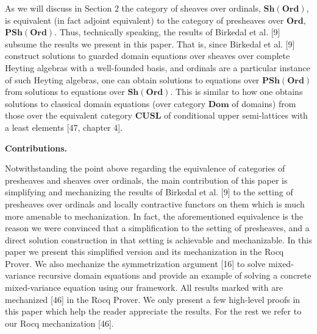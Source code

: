  
As we will discuss in Section 2 the category of sheaves over ordinals, $\mathbf{Sh}(\mathbf{Ord})$, is equivalent (in fact adjoint equivalent) to the category of presheaves over $\mathbf{Ord}$, $\mathbf{PSh}(\mathbf{Ord})$. Thus, technically speaking, the results of Birkedal et al. [9] subsume the results we present in this paper. That is, since Birkedal et al. [9] construct solutions to guarded domain equations over sheaves over complete Heyting algebras with a well-founded basis, and ordinals are a particular instance of such Heyting algebras, one can obtain solutions to equations over $\mathbf{PSh}(\mathbf{Ord})$ from solutions to equations over $\mathbf{Sh}(\mathbf{Ord})$. This is similar to how one obtains solutions to classical domain equations (over category $\mathbf{Dom}$ of domains) from those over the equivalent category $\mathbf{CUSL}$ of conditional upper semi-lattices with a least elements [47, chapter 4].\par
 
 
 
 
\par\medskip\noindent\textbf{Contributions.}\par
 
 
Notwithstanding the point above regarding the equivalence of categories of presheaves and sheaves over ordinals, the main contribution of this paper is simplifying and mechanizing the results of Birkedal et al. [9] to the setting of presheaves over ordinals and locally contractive functors on them which is much more amenable to mechanization. In fact, the aforementioned equivalence is the reason we were convinced that a simplification to the setting of presheaves, and a direct solution construction in that setting is achievable and mechanizable. In this paper we present this simplified version and its mechanization in the Rocq Prover. We also mechanize the symmetrization argument [16] to solve mixed-variance recursive domain equations and provide an example of solving a concrete mixed-variance equation using our framework. All results marked with  are mechanized [46] in the Rocq Prover. We only present a few high-level proofs in this paper which help the reader appreciate the results. For the rest we refer to our Rocq mechanization [46].\par
 
